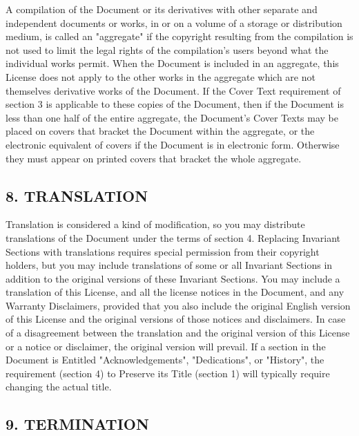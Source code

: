 A compilation of the Document or its derivatives with other separate and independent documents or works, in or on a volume of a storage or distribution medium, is called an "aggregate" if the copyright resulting from the compilation is not used to limit the legal rights of the compilation's users beyond what the individual works permit. When the Document is included in an aggregate, this License does not apply to the other works in the aggregate which are not themselves derivative works of the Document.
If the Cover Text requirement of section 3 is applicable to these copies of the Document, then if the Document is less than one half of the entire aggregate, the Document's Cover Texts may be placed on covers that bracket the Document within the aggregate, or the electronic equivalent of covers if the Document is in electronic form. Otherwise they must appear on printed covers that bracket the whole aggregate.

\subsection{8. TRANSLATION}


Translation is considered a kind of modification, so you may distribute translations of the Document under the terms of section 4. Replacing Invariant Sections with translations requires special permission from their copyright holders, but you may include translations of some or all Invariant Sections in addition to the original versions of these Invariant Sections. You may include a translation of this License, and all the license notices in the Document, and any Warranty Disclaimers, provided that you also include the original English version of this License and the original versions of those notices and disclaimers. In case of a disagreement between the translation and the original version of this License or a notice or disclaimer, the original version will prevail.
If a section in the Document is Entitled "Acknowledgements", "Dedications", or "History", the requirement (section 4) to Preserve its Title (section 1) will typically require changing the actual title.

\subsection{9. TERMINATION}


